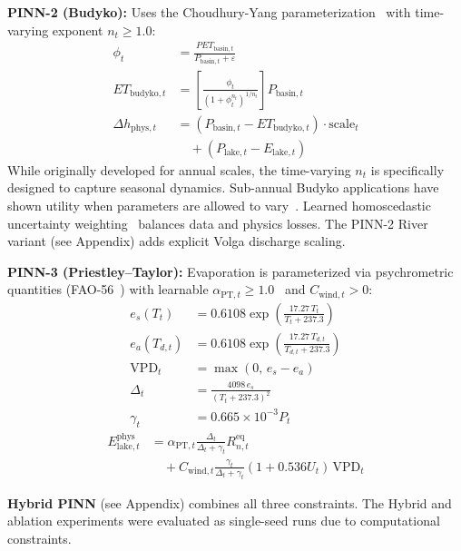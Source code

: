 \documentclass[conference,a4paper]{IEEEtran}
\begin{document}
\textbf{PINN-2 (Budyko):} Uses the Choudhury-Yang parameterization~\cite{choudhury1999evaluation,yang2008new} with time-varying exponent $n_t{\geq}1.0$:
\begin{align}
\phi_t &= \frac{PET_{\text{basin},t}}{P_{\text{basin},t} + \varepsilon} \label{eq:aridity} \\
ET_{\text{budyko},t} &= \left[ \frac{\phi_t}{(1 + \phi_t^{n_t})^{1/n_t}} \right] P_{\text{basin},t} \label{eq:budyko} \\
\Delta h_{\text{phys},t} &= (P_{\text{basin},t} - ET_{\text{budyko},t}) \cdot \text{scale}_t \nonumber\\
&\quad + (P_{\text{lake},t} - E_{\text{lake},t}) \label{eq:pinn2}
\end{align}
While originally developed for annual scales, the time-varying $n_t$ is specifically designed to capture seasonal dynamics. Sub-annual Budyko applications have shown utility when parameters are allowed to vary~\cite{liu2025timevarying}. Learned homoscedastic uncertainty weighting~\cite{kendall2017uncertainty} balances data and physics losses. The PINN-2 River variant (see Appendix) adds explicit Volga discharge scaling.

\textbf{PINN-3 (Priestley--Taylor):} Evaporation is parameterized via psychrometric quantities (FAO-56~\cite{allen1998fao}) with learnable $\alpha_{\text{PT},t}{\geq}1.0$~\cite{priestley1972taylor} and $C_{\text{wind},t}{>}0$:
\begin{align}
e_s(T_t) &= 0.6108 \exp\!\left(\frac{17.27\,T_t}{T_t+237.3}\right) \\
e_a(T_{d,t}) &= 0.6108 \exp\!\left(\frac{17.27\,T_{d,t}}{T_{d,t}+237.3}\right) \nonumber\\
\text{VPD}_t &= \max(0,\, e_s - e_a) \\
\Delta_t &= \frac{4098\,e_s}{(T_t+237.3)^2} \\
\gamma_t &= 0.665\times10^{-3} P_t \label{eq:psychro}
\end{align}
\begin{equation}
\begin{split}
E_{\text{lake},t}^{\text{phys}} &= \alpha_{\text{PT},t} \frac{\Delta_t}{\Delta_t + \gamma_t} R^{\text{eq}}_{n,t} \\
&\quad + C_{\text{wind},t} \frac{\gamma_t}{\Delta_t + \gamma_t} (1 + 0.536U_t)\,\text{VPD}_t \label{eq:pinn3_evap}
\end{split}
\end{equation}

\textbf{Hybrid PINN} (see Appendix) combines all three constraints. The Hybrid and ablation experiments were evaluated as single-seed runs due to computational constraints.
\end{document}
